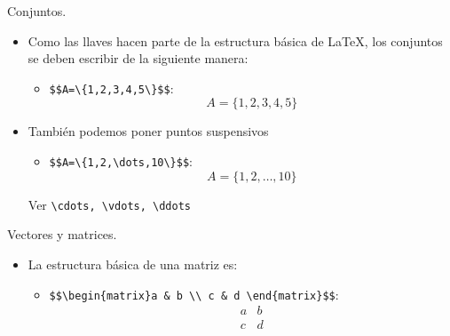 \documentclass[dvipsnames,xcolor, handout]{beamer}
\theoremstyle{plain}
\theoremstyle{definition}
\begin{document}
\begin{frame}[fragile]{Conjuntos.}
\begin{itemize}
    \item Como las llaves hacen parte de la estructura básica de \LaTeX, los conjuntos se deben escribir de la siguiente manera:
    \begin{itemize}
        \item \verb!$$A=\{1,2,3,4,5\}$$!: $$A=\{1,2,3,4,5\}$$
    \end{itemize}\pause
    \item También podemos poner puntos suspensivos
    \begin{itemize}
        \item \verb!$$A=\{1,2,\dots,10\}$$!: $$A=\{1,2,\dots,10\}$$
    \end{itemize}
    Ver \verb!\cdots, \vdots, \ddots!
\end{itemize}
\end{frame}

\begin{frame}[fragile]{Vectores y matrices.}
    \begin{itemize}
        \item La estructura básica de una matriz es:
        \begin{itemize}
            \item \verb!$$\begin{matrix}a & b \\ c & d \end{matrix}$$!: $$\begin{matrix}a & b \\ c & d \end{matrix}$$
        \end{itemize}
        
       
    \end{itemize}
\end{frame}
\end{document}
